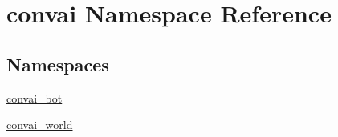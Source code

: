 \hypertarget{namespaceconvai}{}\section{convai Namespace Reference}
\label{namespaceconvai}
\subsection*{Namespaces}
\begin{DoxyCompactItemize}
\item 
 \hyperlink{namespaceconvai_1_1convai__bot}{convai\+\_\+bot}
\item 
 \hyperlink{namespaceconvai_1_1convai__world}{convai\+\_\+world}
\end{DoxyCompactItemize}
